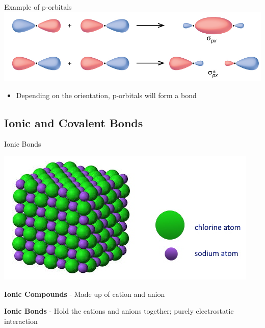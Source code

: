 \documentclass[11pt]{beamer}
\begin{document}
\begin{frame}{Example of p-orbitals}
  \centering
  \includegraphics[width=\linewidth]{p_sigma}
  \begin{itemize}
  \item Depending on the orientation, p-orbitals
    will form a bond
  \end{itemize}
\end{frame}

\subsection{Ionic and Covalent Bonds}

\begin{frame}{Ionic Bonds}
  \begin{center}
    \includegraphics[width=0.6\linewidth]{nacl}
  \end{center}
  
  \textbf{Ionic Compounds} - Made up of cation and anion

  \textbf{Ionic Bonds} - Hold the cations and anions together;
  purely electrostatic interaction

\end{frame}
\end{document}
